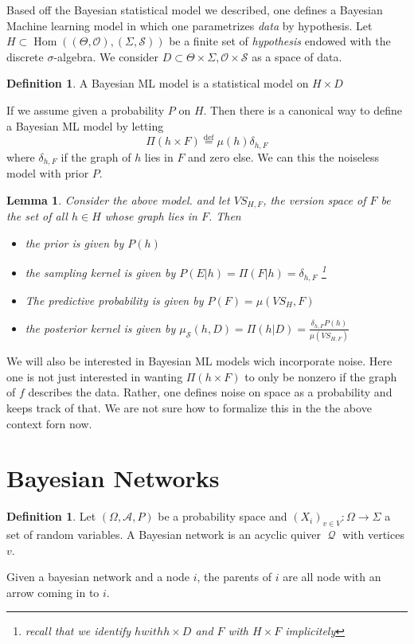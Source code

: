 \documentclass{book}
\theoremstyle{plain}
\newtheorem{lemma}[corollary]{Lemma}
\theoremstyle{definition}
\newtheorem{definition}[corollary]{Definition}
\newcommand{\define}{\stackrel{\operatorname{def}}{=}}
\DeclareMathOperator{\Hom}{Hom}
\newcommand{\mor}{\longrightarrow}
\renewcommand{\r}[1]{\mathcal{#1}}
\DeclareMathOperator{\Qvr}{\mathcal{Q}}
\begin{document}
Based off the Bayesian statistical model we described, one defines a Bayesian Machine learning  model in which one parametrizes \emph{data} by hypothesis.
 Let $H\subset \Hom((\Theta,\r{O}),(\Sigma,\r{S}))$ be a finite set of \emph{hypothesis} endowed with the discrete $\sigma$-algebra. We consider  $D\subset \Theta\times \Sigma, \r{O}\times \r{S}$ as a space  of data.

\begin{definition}
A Bayesian ML model is a statistical model on $H\times D$	
\end{definition}


If we assume given a probability $P$ on $H$. Then there is a canonical way to define a Bayesian ML model by letting
\[
\Pi(h\times F)\define \mu(h)\delta_{h,F}
\]
where $\delta_{h,F}$ if the graph of $h$ lies in $F$ and zero else. We can this the noiseless model with prior $P$.

\begin{lemma}
Consider the above model. and let $VS_{H,F}$, the version space of $F$ be the set of all $h \in H$ whose graph lies in $F$. Then
\begin{itemize}
\item the prior is given by $P(h)$
\item the sampling kernel is given by $P(E\vert h)=\Pi(F\vert h)=\delta_{h,F}$
\footnote{recall that we identify $h with h\times D$ and $F$ with $H\times F$ implicitely}
\item The predictive probability is	given by $P(F)= \mu(VS_H,F)$

\item the posterior kernel is given by $\mu_\r{S}(h,D)=\Pi(h\vert D)=\frac{\delta_{h,F}P(h)}{\mu(VS_{H,F})}$
\end{itemize}
\end{lemma}

We will also be interested in Bayesian ML models wich incorporate noise. Here one is not just interested in wanting $\Pi(h\times F)$ to only be nonzero if the graph of $f$ describes the data. Rather, one defines noise on space as a probability and keeps track of that. We are not sure how to formalize this in the the above context forn now.

\section{Bayesian Networks}

\begin{definition}
Let $(\Omega,\r{A},P)$ be a probability space and $(X_i)_{v \in V}: \Omega\mor \Sigma$ a set of random variables.
A Bayesian network is an acyclic	 quiver  $\Qvr$ with vertices $v$.\\
\end{definition}
Given a bayesian network and a node $i$, the parents of $i$ are all node with an arrow coming in to $i$.
\end{document}
